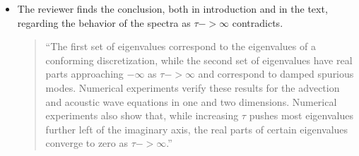 \documentclass[10pt]{article}
\begin{document}
\begin{itemize}
\item The reviewer finds the conclusion, both in introduction and in the text, regarding the behavior of the spectra as $\tau->\infty$ contradicts.

 \begin{quotation}
``The first set of eigenvalues correspond to the eigenvalues of a conforming discretization, while the second set of eigenvalues have real parts approaching $-\infty$ as $\tau-> \infty$ and correspond to damped spurious modes. Numerical experiments verify these results for the advection and acoustic wave equations in one and two dimensions. Numerical experiments also show that, while increasing $\tau$ pushes most eigenvalues further left of the imaginary axis, the real parts of certain eigenvalues converge to zero as $\tau-> \infty$.''
 \end{quotation}


\end{itemize}
\end{document}
